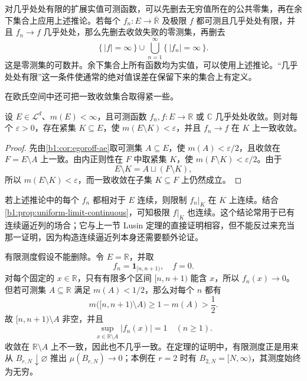 \ProseParagraphBreak

对几乎处处有限的扩展实值可测函数，可以先删去无穷值所在的公共零集，再在余下集合上应用上述推论。若每个
\(f_n:E\rightarrow\overline{\mathbb R}\) 及极限 \(f\) 都可测且几乎处处有限，并且
\(f_n\to f\) 几乎处处，那么先删去收敛失败的零测集，再删去
\[
\{\,|f|=\infty\,\}
\cup\bigcup_{n=1}^{\infty}\{\,|f_n|=\infty\,\}.
\]
这是零测集的可数并。余下集合上所有函数均为实值，可以使用上述推论。“几乎处处有限”这一条件使通常的绝对值误差在保留下来的集合上有定义。

\ProseParagraphBreak

在欧氏空间中还可把一致收敛集合取得紧一些。

\begin{corollary}
\label{b1:cor:egoroff-compact}
设 \(E\in\mathcal L^d\)、\(m(E)<\infty\)，且可测函数
\(f_n,f:E\rightarrow\mathbb R\) 或 \(\mathbb C\) 几乎处处收敛。则对每个
\(\varepsilon>0\)，存在紧集 \(K\subseteq E\)，使
\(m(E\setminus K)<\varepsilon\)，并且 \(f_n\to f\) 在 \(K\) 上一致收敛。
\end{corollary}
\begin{proof}
先由\cref{b1:cor:egoroff-ae}取可测集 \(A\subseteq E\)，使
\(m(A)<\varepsilon/2\)，且收敛在 \(F=E\setminus A\) 上一致。由内正则性在 \(F\) 中取紧集 \(K\)，使
\(m(F\setminus K)<\varepsilon/2\)。由于
\[
E\setminus K=A\sqcup(F\setminus K),
\]
所以 \(m(E\setminus K)<\varepsilon\)，而一致收敛在子集
\(K\subseteq F\) 上仍然成立。
\end{proof}

若上述推论中的每个 \(f_n\) 都相对于 \(E\) 连续，则限制
\(f_n|_K\) 在 \(K\) 上连续。结合%
\cref{b1:prop:uniform-limit-continuous}，可知极限 \(f|_K\) 也连续。这个结论常用于已有连续逼近列的场合；它与上一节 Lusin 定理的直接证明相容，但不能反过来充当那一证明，因为构造连续逼近列本身还需要额外论证。

\ProseParagraphBreak

有限测度假设不能删除。令 \(E=\mathbb R\)，并取
\[
f_n=\mathbf 1_{[n,n+1)},
\quad
f=0.
\]
对每个固定的 \(x\in\mathbb R\)，只有有限多个区间 \([n,n+1)\) 能含
\(x\)，所以 \(f_n(x)\to0\)。但若可测集 \(A\subseteq\mathbb R\) 满足
\(m(A)<1/2\)，那么对每个 \(n\) 都有
\[
m\bigl([n,n+1)\setminus A\bigr)
\geq1-m(A)>\frac12.
\]
故 \([n,n+1)\setminus A\) 非空，并且
\[
\sup_{x\in\mathbb R\setminus A}|f_n(x)|=1
\quad(n\geq1).
\]
收敛在 \(\mathbb R\setminus A\) 上不一致，因此也不几乎一致。在定理的证明中，有限测度正是用来从
\(B_{r,N}\downarrow\varnothing\) 推出 \(\mu(B_{r,N})\to0\)；本例在
\(r=2\) 时有 \(B_{2,N}=[N,\infty)\)，其测度始终为无穷。

